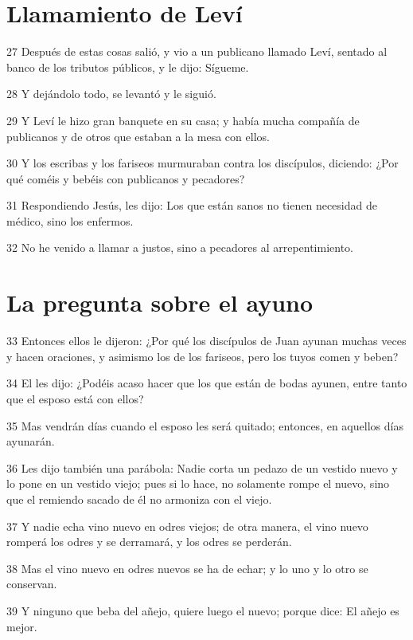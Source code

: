 \section*{Llamamiento de Leví}

\par 27 Después de estas cosas salió, y vio a un publicano llamado Leví, sentado al banco de los tributos públicos, y le dijo: Sígueme.
\par 28 Y dejándolo todo, se levantó y le siguió.
\par 29 Y Leví le hizo gran banquete en su casa; y había mucha compañía de publicanos y de otros que estaban a la mesa con ellos.
\par 30 Y los escribas y los fariseos murmuraban contra los discípulos, diciendo: ¿Por qué coméis y bebéis con publicanos y pecadores?
\par 31 Respondiendo Jesús, les dijo: Los que están sanos no tienen necesidad de médico, sino los enfermos.
\par 32 No he venido a llamar a justos, sino a pecadores al arrepentimiento.

\section*{La pregunta sobre el ayuno}

\par 33 Entonces ellos le dijeron: ¿Por qué los discípulos de Juan ayunan muchas veces y hacen oraciones, y asimismo los de los fariseos, pero los tuyos comen y beben?
\par 34 El les dijo: ¿Podéis acaso hacer que los que están de bodas ayunen, entre tanto que el esposo está con ellos?
\par 35 Mas vendrán días cuando el esposo les será quitado; entonces, en aquellos días ayunarán.
\par 36 Les dijo también una parábola: Nadie corta un pedazo de un vestido nuevo y lo pone en un vestido viejo; pues si lo hace, no solamente rompe el nuevo, sino que el remiendo sacado de él no armoniza con el viejo.
\par 37 Y nadie echa vino nuevo en odres viejos; de otra manera, el vino nuevo romperá los odres y se derramará, y los odres se perderán.
\par 38 Mas el vino nuevo en odres nuevos se ha de echar; y lo uno y lo otro se conservan.
\par 39 Y ninguno que beba del añejo, quiere luego el nuevo; porque dice: El añejo es mejor.

